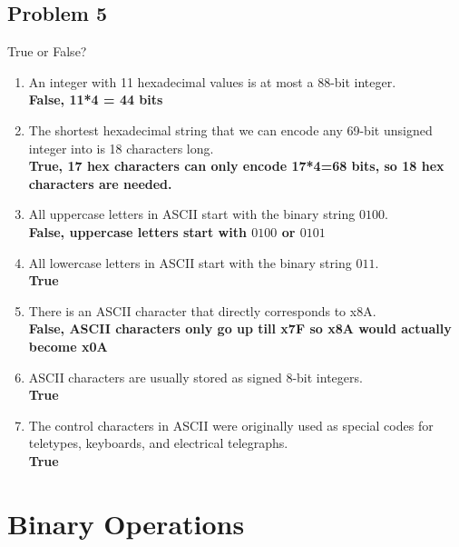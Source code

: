 \documentclass{article}
\begin{document}
\subsection*{Problem 5}
True or False?
\begin{enumerate}[label=\alph*.]
    \item An integer with 11 hexadecimal values is at most a 88-bit integer.\\
    \textbf{False, 11*4 = 44 bits}
    \item The shortest hexadecimal string that we can encode any 69-bit unsigned integer into is 18 characters long.\\
    \textbf{True, 17 hex characters can only encode 17*4=68 bits, so 18 hex characters are needed.}
    \item All uppercase letters in ASCII start with the binary string $0100$.\\
    \textbf{False, uppercase letters start with $0100$ or $0101$}
    \item All lowercase letters in ASCII start with the binary string $011$.\\
    \textbf{True}
    \item There is an ASCII character that directly corresponds to x8A.\\
    \textbf{False, ASCII characters only go up till x7F so x8A would actually become x0A}
    \item ASCII characters are usually stored as signed 8-bit integers.\\
    \textbf{True}
    \item The control characters in ASCII were originally used as special codes for teletypes, keyboards, and electrical telegraphs.\\
    \textbf{True}
\end{enumerate}

\newpage
\section*{Binary Operations} %
\end{document}
